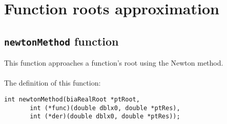 \FloatBarrier

\section{Function roots approximation}

\subsection{\texttt{newtonMethod} function}

This function approaches a function's root using the Newton method.\\ \\
%
The definition of this function:
%
\begin{verbatim}
int newtonMethod(biaRealRoot *ptRoot, 
       int (*func)(double dblx0, double *ptRes),
       int (*der)(double dblx0, double *ptRes));  
\end{verbatim}


